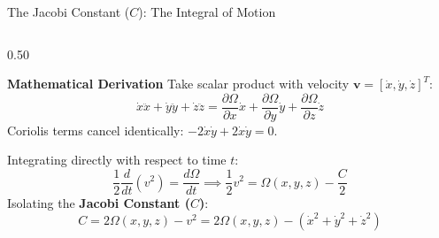 \documentclass[aspectratio=169, 10pt]{beamer}
\begin{document}
\begin{frame}{The Jacobi Constant ($C$): The Integral of Motion}
    \begin{columns}[t]
        \begin{column}{0.50\textwidth}
            \begin{block}{\textbf{Mathematical Derivation}}
                \scriptsize
                Take scalar product with velocity $\mathbf{v} = [\dot{x}, \dot{y}, \dot{z}]^T$:
                \begin{equation*}
                    \dot{x}\ddot{x} + \dot{y}\ddot{y} + \dot{z}\ddot{z} = \frac{\partial \Omega}{\partial x}\dot{x} + \frac{\partial \Omega}{\partial y}\dot{y} + \frac{\partial \Omega}{\partial z}\dot{z}
                \end{equation*}
                Coriolis terms cancel identically: $-2\dot{x}\dot{y} + 2\dot{x}\dot{y} = 0$.
                \par\vspace{2pt}
                Integrating directly with respect to time $t$:
                \begin{equation*}
                    \frac{1}{2}\frac{d}{dt}(v^2) = \frac{d\Omega}{dt} \implies \frac{1}{2}v^2 = \Omega(x,y,z) - \frac{C}{2}
                \end{equation*}
                Isolating the \textbf{Jacobi Constant ($C$)}:
                \begin{equation*}
                    C = 2\Omega(x,y,z) - v^2 = 2\Omega(x,y,z) - (\dot{x}^2 + \dot{y}^2 + \dot{z}^2)
                \end{equation*}
            \end{block}
        \end{column}
        

\end{columns}
\end{frame}
\end{document}
